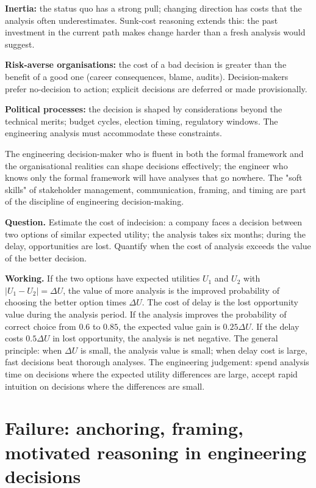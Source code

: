\textbf{Inertia:} the status quo has a strong pull; changing direction has costs that the analysis often underestimates. Sunk-cost reasoning extends this: the past investment in the current path makes change harder than a fresh analysis would suggest.

\textbf{Risk-averse organisations:} the cost of a bad decision is greater than the benefit of a good one (career consequences, blame, audits). Decision-makers prefer no-decision to action; explicit decisions are deferred or made provisionally.

\textbf{Political processes:} the decision is shaped by considerations beyond the technical merits; budget cycles, election timing, regulatory windows. The engineering analysis must accommodate these constraints.

The engineering decision-maker who is fluent in both the formal framework and the organisational realities can shape decisions effectively; the engineer who knows only the formal framework will have analyses that go nowhere. The "soft skills" of stakeholder management, communication, framing, and timing are part of the discipline of engineering decision-making.

\begin{estimation}
\textbf{Question.} Estimate the cost of indecision: a company faces a decision between two options of similar expected utility; the analysis takes six months; during the delay, opportunities are lost. Quantify when the cost of analysis exceeds the value of the better decision.

\textbf{Working.} If the two options have expected utilities $U_1$ and $U_2$ with $|U_1 - U_2| = \Delta U$, the value of more analysis is the improved probability of choosing the better option times $\Delta U$. The cost of delay is the lost opportunity value during the analysis period. If the analysis improves the probability of correct choice from $0.6$ to $0.85$, the expected value gain is $0.25 \Delta U$. If the delay costs $0.5 \Delta U$ in lost opportunity, the analysis is net negative. The general principle: when $\Delta U$ is small, the analysis value is small; when delay cost is large, fast decisions beat thorough analyses. The engineering judgement: spend analysis time on decisions where the expected utility differences are large, accept rapid intuition on decisions where the differences are small.
\end{estimation}

\section{Failure: anchoring, framing, motivated reasoning in engineering decisions}

